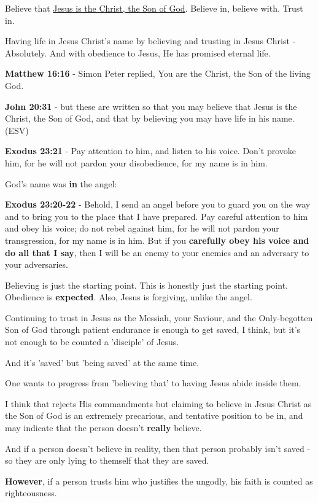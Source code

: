 \documentclass[11pt]{article}
\begin{document}
Believe that \uline{Jesus is the Christ, the Son of God}. Believe in, believe with. Trust in.

Having life in Jesus Christ's name by believing and trusting in Jesus Christ - Absolutely.
And with obedience to Jesus, He has promised eternal life.

\textbf{Matthew 16:16} - Simon Peter replied, You are the Christ, the Son of the living God.

\textbf{John 20:31} - but these are written so that you may believe that Jesus is the Christ, the Son of God, and that by believing you may have life in his name. (ESV)

\textbf{Exodus 23:21} - Pay attention to him, and listen to his voice. Don't provoke him, for he will not pardon your disobedience, for my name is in him.

God's name was \textbf{in} the angel:

\textbf{Exodus 23:20-22} - Behold, I send an angel before you to guard you on the way and to bring you to the place that I have prepared. Pay careful attention to him and obey his voice; do not rebel against him, for he will not pardon your transgression, for my name is in him. But if you \textbf{carefully obey his voice and do all that I say}, then I will be an enemy to your enemies and an adversary to your adversaries.

Believing is just the starting point. This is honestly just the starting point. Obedience is \textbf{expected}. Also, Jesus is forgiving, unlike the angel.

Continuing to trust in Jesus as the Messiah, your Saviour, and the Only-begotten Son of God through patient endurance is enough to get saved, I think, but it's not enough to be counted a 'disciple' of Jesus.

And it's 'saved' but 'being saved' at the same time.

One wants to progress from 'believing that' to having Jesus abide inside them.

I think that rejects His commandments but claiming to believe in Jesus Christ as the Son of God is an extremely precarious, and tentative position to be in,
and may indicate that the person doesn't \textbf{really} believe.

And if a person doesn't believe in reality, then that person probably isn't saved - so they are only lying to themself that they are saved.

\textbf{However}, if a person trusts him who justifies the ungodly, his faith is counted as righteousness.
\end{document}
